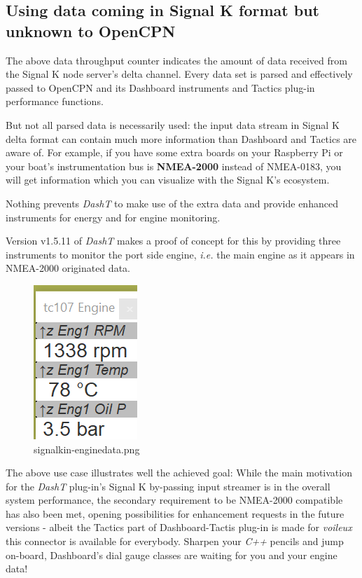 \documentclass[11pt]{article}
\begin{document}
    \hypertarget{using-data-coming-in-signal-k-format-but-unknown-to-opencpn}{%
\subsection{Using data coming in Signal K format but unknown to
OpenCPN}\label{using-data-coming-in-signal-k-format-but-unknown-to-opencpn}}

    The above data throughput counter indicates the amount of data received
from the Signal K node server's delta channel. Every data set is parsed
and effectively passed to OpenCPN and its Dashboard instruments and
Tactics plug-in performance functions.

    But not all parsed data is necessarily used: the input data stream in
Signal K delta format can contain much more information than Dashboard
and Tactics are aware of. For example, if you have some extra boards on
your Raspberry Pi or your boat's instrumentation bus is
\textbf{NMEA-2000} instead of NMEA-0183, you will get information which
you can visualize with the Signal K's ecosystem.

    Nothing prevents \emph{DashT} to make use of the extra data and provide
enhanced instruments for energy and for engine monitoring.

    Version v1.5.11 of \emph{DashT} makes a proof of concept for this by
providing three instruments to monitor the port side engine, \emph{i.e.}
the main engine as it appears in NMEA-2000 originated data.

    \begin{figure}
\centering
\includegraphics{signalkin-enginedata.png}
\caption{signalkin-enginedata.png}
\end{figure}

    The above use case illustrates well the achieved goal: While the main
motivation for the \emph{DashT} plug-in's Signal K by-passing input
streamer is in the overall system performance, the secondary requirement
to be NMEA-2000 compatible has also been met, opening possibilities for
enhancement requests in the future versions - albeit the Tactics part of
Dashboard-Tactis plug-in is made for \emph{voileux} this connector is
available for everybody. Sharpen your \emph{C++} pencils and jump
on-board, Dashboard's dial gauge classes are waiting for you and your
engine data!
\end{document}
